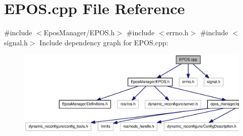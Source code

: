 \section{\-E\-P\-O\-S.\-cpp \-File \-Reference}
\label{EPOS_8cpp}
{\ttfamily \#include $<$\-Epos\-Manager/\-E\-P\-O\-S.\-h$>$}\*
{\ttfamily \#include $<$errno.\-h$>$}\*
{\ttfamily \#include $<$signal.\-h$>$}\*
\-Include dependency graph for \-E\-P\-O\-S.\-cpp\-:
\nopagebreak
\begin{figure}[H]
\begin{center}
\leavevmode
\includegraphics[width=350pt]{EPOS_8cpp__incl}
\end{center}
\end{figure}
